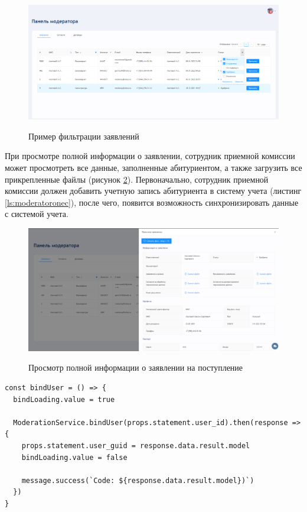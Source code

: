 \begin{figure}[H]
\begin{center}
\includegraphics[width=1\hsize]{fig/moderator-filter.png}\\[2mm]
\caption{Пример фильтрации заявлений}\label{fig:moderatorfilter}
\end{center}
\end{figure}

При просмотре полной информации о заявлении, сотрудник приемной комиссии может просмотреть все данные, заполненные абитуриентом, а также загрузить все прикрепленные файлы (рисунок \ref{fig:moderatorstatementview}). Первоначально, сотрудник приемной комиссии должен добавить учетную запись абитуриента в систему учета (листинг \ref{ls:moderatoronec}), после чего, появится возможность синхронизировать данные с системой учета.

\begin{figure}[H]
\begin{center}
\includegraphics[width=1\hsize]{fig/moderator-view.png}\\[2mm]
\caption{Просмотр полной информации о заявлении на поступление}\label{fig:moderatorstatementview}
\end{center}
\end{figure}

\begin{lstlisting}[caption={Метод добавляющий учетную запись абитуриента в систему учета}, label={ls:moderatoronec}]
const bindUser = () => {
  bindLoading.value = true

  ModerationService.bindUser(props.statement.user_id).then(response => {
    props.statement.user_guid = response.data.result.model
    bindLoading.value = false

    message.success(`Code: ${response.data.result.model})`)
  })
}
\end{lstlisting}

